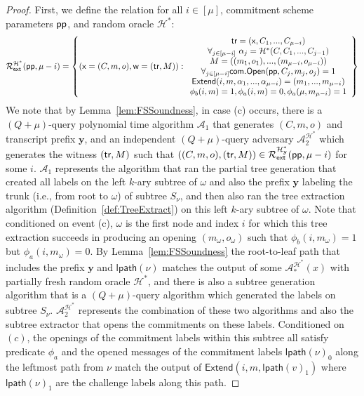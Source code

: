 \begin{proof}
	 First, we define the relation for all $i \in [\mu]$, commitment scheme parameters $\textsf{pp}$, and random oracle $\mathcal{H}^*$: 
	 $$\mathcal{R}^{\mathcal{H^*}}_\textsf{ext}(\textsf{pp}, \mu - i) = \left\{(\mathsf{x} = (C, m, o), \mathsf{w} = (\textsf{{tr}}, M)): \begin{array}{c} \textsf{{tr}} = (\mathsf{x}, C_1,...,C_{\mu-i}) \\ \forall_{j \in [\mu-i]} \ \alpha_j = \mathcal{H}^*(C,C_1,...,C_{j-1}) \\ M = ((m_1,o_1),...,(m_{\mu-i}, o_{\mu-i})) \\ \forall_{j \in [\mu-i]} \textsf{com}.\textsf{{Open}}(\textsf{pp},C_j, m_j, o_j) = 1 \\ \textsf{Extend}(i,m,\alpha_1,...,\alpha_{\mu-i}) = (m_1,...,m_{\mu - i}) \\ \phi_b(i,m) = 1, \phi_a(i, m) = 0, \phi_a(\mu, m_{\mu - i}) = 1  \end{array} \right\} $$
	 We note that by Lemma~\ref{lem:FSSoundness}, in case (c) occurs, there is a $(Q+\mu)$-query polynomial time algorithm $\mathcal{A}_1$ that generates $(C,m,o)$ and transcript prefix $\mathbf{y}$, and an independent $(Q + \mu)$-query adversary $\mathcal{A}_2^{\mathcal{H}^*}$ which generates the witness $(\textsf{{tr}}, M)$ such that $((C, m, o), (\textsf{{tr}}, M)) \in \mathcal{R}^{\mathcal{H}^*_\mathbf{y}}_\textsf{ext}(\textsf{pp}, \mu - i)$ for some $i$. $\mathcal{A}_1$ represents the algorithm that ran the partial tree generation that created all labels on the left $k$-ary subtree of $\omega$ and also the prefix $\mathbf{y}$ labeling the trunk (i.e., from root to $\omega$) of subtree $S_\nu$, and then also ran the tree extraction algorithm (Definition~\ref{def:TreeExtract}) on this left $k$-ary subtree of $\omega$. Note that conditioned on event (c), $\omega$ is the first node and index $i$ for which this tree extraction succeeds in producing an opening $(m_\omega, o_\omega)$ such that $\phi_b(i, m_\omega) = 1$ but $\phi_a(i, m_\omega) = 0$. By Lemma~\ref{lem:FSSoundness} the root-to-leaf path that includes the prefix $\mathbf{y}$ and $\textsf{lpath}(\nu)$ matches the output of some $\mathcal{A}_*^{\mathcal{H}^*}(x)$ with partially fresh random oracle $\mathcal{H}^*$, and there is also a subtree generation algorithm that is a $(Q+\mu)$-query algorithm which generated the labels on subtree $S_\nu$. $\mathcal{A}^{\mathcal{H}^*}_2$ represents the combination of these two algorithms and also the subtree extractor that opens the commitments on these labels. Conditioned on $(c)$, the openings of the commitment labels within this subtree all satisfy predicate $\phi_a$ and the opened messages of the commitment labels $\textsf{lpath}(\nu)_0$ along the leftmost path from $\nu$ match the output of $\textsf{Extend}(i, m, \textsf{lpath}(v)_1)$ where $\textsf{lpath}(\nu)_1$ are the challenge labels along this path. 
	 

\end{proof}
